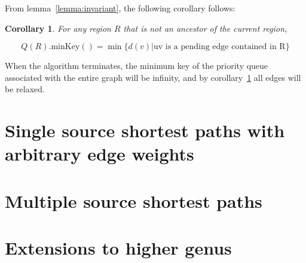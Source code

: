 \documentclass[12pt]{article}
\newtheorem{corollary}{Corollary}[theorem]
\begin{document}
From lemma~\ref{lemma:invariant}, the following corollary follows:\\

\begin{corollary}
\label{cor:relaxed}
  For any region $R$ that is not an ancestor of the current region,

  \[
    Q(R).\text{minKey}() = \min \{ d(v) | \text{uv is a pending edge contained in R} \}
  \]
\end{corollary}

When the algorithm terminates, the minimum key of the priority queue associated with the entire graph will be infinity, and by corollary~\ref{cor:relaxed} all edges will be relaxed.

\section{Single source shortest paths with arbitrary edge weights}
\label{sec:arbitr-edge-weights}

\section{Multiple source shortest paths}
\label{sec:mult-source-short}

\section{Extensions to higher genus}
\label{sec:extens-high-genus}




\end{document}

